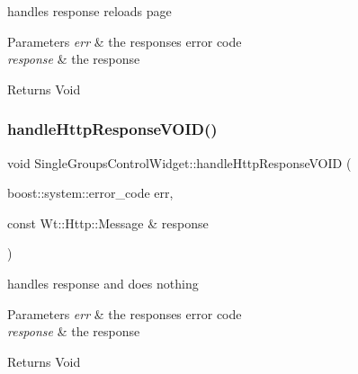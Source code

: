 handles response reloads page 


\begin{DoxyParams}{Parameters}
{\em err} & the response\textquotesingle{}s error code \\
\hline
{\em response} & the response \\
\hline
\end{DoxyParams}
\begin{DoxyReturn}{Returns}
Void 
\end{DoxyReturn}
\mbox{\label{class_single_groups_control_widget_a8f1e4dc31eb242ce4284a1bad9d2fbcb}} 
\subsubsection{\texorpdfstring{handle\+Http\+Response\+V\+O\+I\+D()}{handleHttpResponseVOID()}}
{\footnotesize\ttfamily void Single\+Groups\+Control\+Widget\+::handle\+Http\+Response\+V\+O\+ID (\begin{DoxyParamCaption}\item[{boost\+::system\+::error\+\_\+code}]{err,  }\item[{const Wt\+::\+Http\+::\+Message \&}]{response }\end{DoxyParamCaption})\hspace{0.3cm}{\ttfamily [private]}}



handles response and does nothing 


\begin{DoxyParams}{Parameters}
{\em err} & the response\textquotesingle{}s error code \\
\hline
{\em response} & the response \\
\hline
\end{DoxyParams}
\begin{DoxyReturn}{Returns}
Void 
\end{DoxyReturn}
\mbox{\label{class_single_groups_control_widget_a5da8fa2f328e6484b3cc3940ff09dd77}} 
